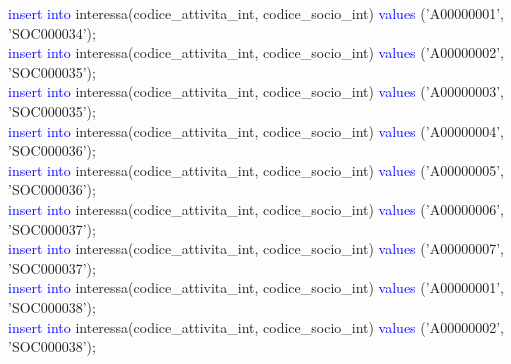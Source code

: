 \documentclass{article}
\begin{document}
\begin{flushleft}
{        \hspace*{0.5em}\textcolor{blue}{insert into} interessa(codice\_attivita\_int, codice\_socio\_int) \textcolor{blue}{values} \hspace*{0.5em}('A00000001', 'SOC000034'); \\
        \hspace*{0.5em}\textcolor{blue}{insert into} interessa(codice\_attivita\_int, codice\_socio\_int) \textcolor{blue}{values} \hspace*{0.5em}('A00000002', 'SOC000035'); \\
        \hspace*{0.5em}\textcolor{blue}{insert into} interessa(codice\_attivita\_int, codice\_socio\_int) \textcolor{blue}{values} \hspace*{0.5em}('A00000003', 'SOC000035'); \\
        \hspace*{0.5em}\textcolor{blue}{insert into} interessa(codice\_attivita\_int, codice\_socio\_int) \textcolor{blue}{values} \hspace*{0.5em}('A00000004', 'SOC000036'); \\
        \hspace*{0.5em}\textcolor{blue}{insert into} interessa(codice\_attivita\_int, codice\_socio\_int) \textcolor{blue}{values} \hspace*{0.5em}('A00000005', 'SOC000036'); \\
        \hspace*{0.5em}\textcolor{blue}{insert into} interessa(codice\_attivita\_int, codice\_socio\_int) \textcolor{blue}{values} \hspace*{0.5em}('A00000006', 'SOC000037'); \\
        \hspace*{0.5em}\textcolor{blue}{insert into} interessa(codice\_attivita\_int, codice\_socio\_int) \textcolor{blue}{values} \hspace*{0.5em}('A00000007', 'SOC000037'); \\
        \hspace*{0.5em}\textcolor{blue}{insert into} interessa(codice\_attivita\_int, codice\_socio\_int) \textcolor{blue}{values} \hspace*{0.5em}('A00000001', 'SOC000038'); \\
        \hspace*{0.5em}\textcolor{blue}{insert into} interessa(codice\_attivita\_int, codice\_socio\_int) \textcolor{blue}{values} \hspace*{0.5em}('A00000002', 'SOC000038'); \\
}
\end{flushleft}
\end{document}
